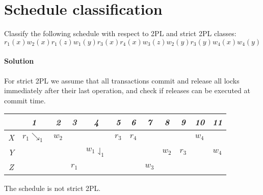 \section{Schedule classification}

Classify the following schedule with respect to 2PL and strict 2PL classes: 
\[r_1(x) w_2(x) r_1(z) w_1(y) r_3(x) r_4(x) w_3(z) w_2(y) r_3(y) w_4(x) w_4(y)\]

\paragraph*{Solution}
For strict 2PL we assume that all transactions commit and release all locks immediately after their last operation, and check if releases can be executed at commit time.
\begin{table}[H]
    \centering
    \begin{tabular}{c|ccccccccccc}
                & \textit{1} & \textit{2} & \textit{3} & \textit{4} & \textit{5} & \textit{6} & \textit{7} & \textit{8} & \textit{9} & \textit{10} & \textit{11}          \\ \hline
    \textit{X} & $r_1\searrow_1$       & $w_2$      &            &                                  & $r_3$      & $r_4$      &            &            &            & $w_4$       &                    \\
    \textit{Y} &                       &            &            & $w_1\downharpoonleft_1$          &            &            &            & $w_2$      & $r_3$      &             & $w_4$                \\
    \textit{Z} &                       &            & $r_1$      &                                  &            &            & $w_3$      &            &            &             &                     
    \end{tabular}%
\end{table}
The schedule is not strict 2PL.

